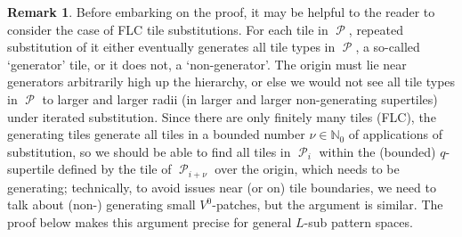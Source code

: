 \documentclass[11pt]{amsart}
\numberwithin{equation}{section}
\theoremstyle{plain}
\theoremstyle{definition}
\newtheorem{remark}[theorem]{Remark}
\newcommand{\N}{\mathbb N}
\DeclareMathOperator{\cP}{\mathcal{P}}
\begin{document}
\begin{remark}
Before embarking on the proof, it may be helpful to the reader to consider the case of FLC tile substitutions. For each tile in \(\cP\), repeated substitution of it either eventually generates all tile types in \(\cP\), a so-called `generator' tile, or it does not, a `non-generator'. The origin must lie near generators arbitrarily high up the hierarchy, or else we would not see all tile types in \(\cP\) to larger and larger radii (in larger and larger non-generating supertiles) under iterated substitution. Since there are only finitely many tiles (FLC), the generating tiles generate all tiles in a bounded number \(\nu \in \N_0\) of applications of substitution, so we should be able to find all tiles in \(\cP_i\) within the (bounded) \(q\)-supertile defined by the tile of \(\cP_{i+\nu}\) over the origin, which needs to be generating; technically, to avoid issues near (or on) tile boundaries, we need to talk about (non-) generating small \(V^0\)-patches, but the argument is similar. The proof below makes this argument precise for general \(L\)-sub pattern spaces.
\end{remark}
\end{document}
